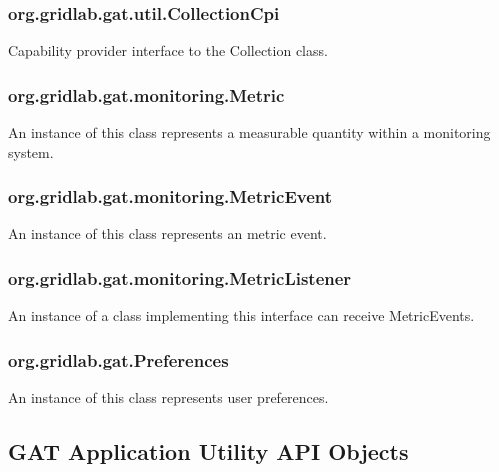 \documentclass[$Date: 2003/06/26 19:29:31 $]{glabarticle}
\begin{document}
\subsubsection{org.gridlab.gat.util.CollectionCpi}

Capability provider interface to the Collection class.

\subsubsection{org.gridlab.gat.monitoring.Metric}

An instance of this class represents a measurable quantity within a monitoring system.

\subsubsection{org.gridlab.gat.monitoring.MetricEvent}

An instance of this class represents an metric event.

\subsubsection{org.gridlab.gat.monitoring.MetricListener}

An instance of a class implementing this interface can receive MetricEvents.

\subsubsection{org.gridlab.gat.Preferences}

An instance of this class represents user preferences. 


\subsection{GAT Application Utility API Objects}
\end{document}
